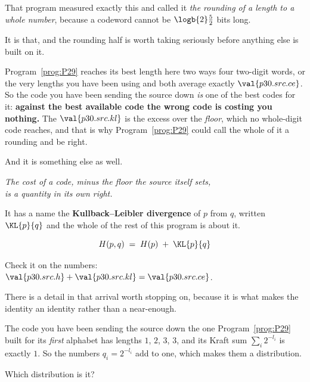 \begin{fr}

That program measured exactly this and called it \emph{the rounding of a
length to a whole number}, because a codeword cannot be
$\logb{2}\frac{5}{2}$ bits long.

It is that, and the rounding half is worth taking seriously before anything
else is built on it.

Program~\ref{prog:P29} reaches its best length here two ways \dash{} four
two-digit words, or the very lengths you have been using \dash{} and both
average exactly $\val{p30.src.ce}$. So the code you have been sending the
source down \emph{is} one of the best codes for it: \textbf{against the best
available code the wrong code is costing you nothing.} The
$\val{p30.src.kl}$ is the excess over the \emph{floor}, which no whole-digit
code reaches, and that is why Program~\ref{prog:P29} could call the whole of
it a rounding and be right.

And it is something else as well.

\begin{center}
\emph{The cost of a code, minus the floor the source itself sets,\\
is a quantity in its own right.}
\end{center}

It has a name \dash{} the \textbf{Kullback--Leibler divergence} of $p$ from
$q$, written $\KL{p}{q}$ \dash{} and the whole of the rest of this program
is about it.

\[ H(p, q) \;=\; H(p) \;+\; \KL{p}{q} \]

Check it on the numbers: $\val{p30.src.h} + \val{p30.src.kl}
= \val{p30.src.ce}$.
\end{fr}

\begin{fr}
There is a detail in that arrival worth stopping on, because it is what makes
the identity an identity rather than a near-enough.

The code you have been sending the source down \dash{} the one
Program~\ref{prog:P29} built for its \emph{first} alphabet \dash{} has
lengths $1$, $2$, $3$, $3$, and its Kraft sum $\sum_i 2^{-l_i}$ is exactly
$1$. So the numbers $q_i = 2^{-l_i}$ add to one, which makes them a
distribution.

Which distribution is it?
\dotline
\nextframe
\end{fr}

